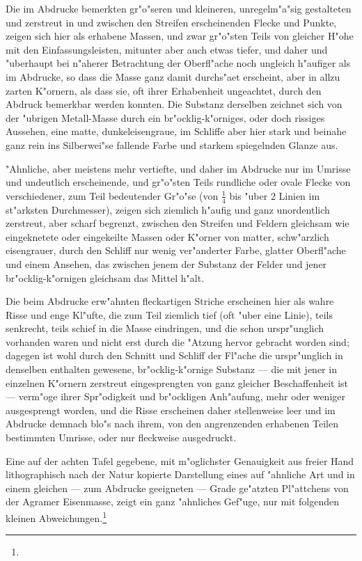 \documentclass[a4paper, 11pt, oneside, german]{article}
\begin{document}
Die im Abdrucke bemerkten gr"o"seren und kleineren, unregelm"a"sig gestalteten und zerstreut in und zwischen den Streifen erscheinenden Flecke und Punkte, zeigen sich hier als erhabene Massen, und zwar gr"o"sten Teils von gleicher H"ohe mit den Einfassungsleisten, mitunter aber auch etwas tiefer, und daher und "uberhaupt bei n"aherer Betrachtung der Oberfl"ache noch ungleich h"aufiger als im Abdrucke, so dass die Masse ganz damit durchs"aet erscheint, aber in allzu zarten K"ornern, als dass sie, oft ihrer Erhabenheit ungeachtet, durch den Abdruck bemerkbar werden konnten. Die Substanz derselben zeichnet sich von der "ubrigen Metall-Masse durch ein br"ocklig-k"orniges, oder doch rissiges Aussehen, eine matte, dunkeleisengraue, im Schliffe aber hier stark und beinahe ganz rein ins Silberwei"se fallende Farbe und starkem spiegelnden Glanze aus.

"Ahnliche, aber meistens mehr vertiefte, und daher im Abdrucke nur im Umrisse und undeutlich erscheinende, und gr"o"sten Teils rundliche oder ovale Flecke von verschiedener, zum Teil bedeutender Gr"o"se (von $\frac{1}{4}$ bis "uber 2 Linien im st"arksten Durchmesser), zeigen sich ziemlich h"aufig und ganz unordentlich zerstreut, aber scharf begrenzt, zwischen den Streifen und Feldern gleichsam wie eingeknetete oder eingekeilte Massen oder K"orner von matter, schw"arzlich eisengrauer, durch den Schliff nur wenig ver"anderter Farbe, glatter Oberfl"ache und einem Ansehen, das zwischen jenem der Substanz der Felder und jener br"ocklig-k"ornigen gleichsam das Mittel h"alt.

Die beim Abdrucke erw"ahnten fleckartigen Striche erscheinen hier als wahre Risse und enge Kl"ufte, die zum Teil ziemlich tief (oft "uber eine Linie), teils senkrecht, teils schief in die Masse eindringen, und die schon urspr"unglich vorhanden waren und nicht erst durch die "Atzung hervor gebracht worden sind; dagegen ist wohl durch den Schnitt und Schliff der Fl"ache die urspr"unglich in denselben enthalten gewesene, br"ocklig-k"ornige Substanz --- die mit jener in einzelnen K"ornern zerstreut eingesprengten von ganz gleicher Beschaffenheit ist --- verm"oge ihrer Spr"odigkeit und br"ockligen Anh"aufung, mehr oder weniger ausgesprengt worden, und die Risse erscheinen daher stellenweise leer und im Abdrucke demnach blo"s nach ihrem, von den angrenzenden erhabenen Teilen bestimmten Umrisse, oder nur fleckweise ausgedruckt.

Eine auf der achten Tafel gegebene, mit m"oglichster Genauigkeit aus freier Hand lithographisch nach der Natur kopierte Darstellung eines auf "ahnliche Art und in einem gleichen --- zum Abdrucke geeigneten --- Grade ge"atzten Pl"attchens von der Agramer Eisenmasse, zeigt ein ganz "ahnliches Gef"uge, nur mit folgenden kleinen Abweichungen.\footnote{}
\end{document}
